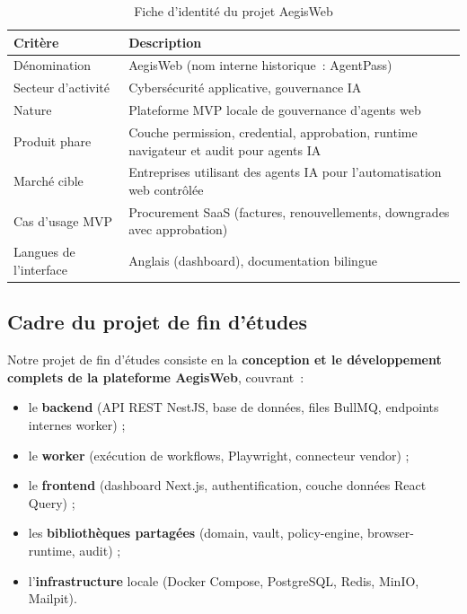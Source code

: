 \begin{table}[H]
\centering
\caption{Fiche d'identité du projet AegisWeb}
\label{tab:fiche_projet}
\begin{tabularx}{\textwidth}{@{}lX@{}}
\toprule
\textbf{Critère}         & \textbf{Description} \\
\midrule
Dénomination             & AegisWeb (nom interne historique~: AgentPass) \\
\rowcolor{rowgray}
Secteur d'activité       & Cybersécurité applicative, gouvernance IA \\
Nature                   & Plateforme MVP locale de gouvernance d'agents web \\
\rowcolor{rowgray}
Produit phare            & Couche permission, credential, approbation, runtime
                           navigateur et audit pour agents IA \\
Marché cible             & Entreprises utilisant des agents IA pour
                           l'automatisation web contrôlée \\
\rowcolor{rowgray}
Cas d'usage MVP          & Procurement SaaS (factures, renouvellements,
                           downgrades avec approbation) \\
Langues de l'interface   & Anglais (dashboard), documentation bilingue \\
\bottomrule
\end{tabularx}
\end{table}

\subsection{Cadre du projet de fin d'études}

Notre projet de fin d'études consiste en la \textbf{conception et le
développement complets de la plateforme AegisWeb}, couvrant~:
\begin{itemize}[leftmargin=1.8cm, itemsep=3pt]
  \item le \textbf{backend} (API REST NestJS, base de données, files
    BullMQ, endpoints internes worker) ;
  \item le \textbf{worker} (exécution de workflows, Playwright, connecteur
    vendor) ;
  \item le \textbf{frontend} (dashboard Next.js, authentification, couche
    données React Query) ;
  \item les \textbf{bibliothèques partagées} (domain, vault, policy-engine,
    browser-runtime, audit) ;
  \item l'\textbf{infrastructure} locale (Docker Compose, PostgreSQL,
    Redis, MinIO, Mailpit).
\end{itemize}

